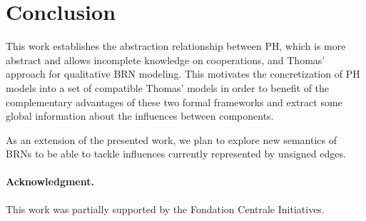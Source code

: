 \section{Conclusion}

This work establishes the abstraction relationship between PH, which is more abstract and allows incomplete knowledge on cooperations, and Thomas' approach for qualitative BRN modeling.
This motivates the concretization of PH models into a set of compatible Thomas' models in order to benefit of the complementary advantages of these two formal frameworks and extract some global information about the influences between components.

As an extension of the presented work, we plan to explore new semantics of BRNs to be able to tackle influences currently represented by unsigned edges.

\paragraph{Acknowledgment.}
This work was partially supported by the Fondation Centrale Initiatives.

